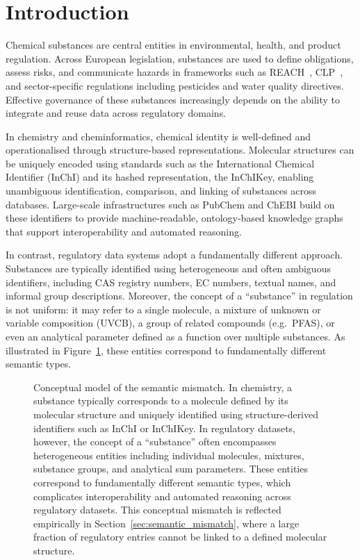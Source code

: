 \section{Introduction}
\label{sec:introduction}

Chemical substances are central entities in environmental, health, and product regulation. Across European legislation, substances are used to define obligations, assess risks, and communicate hazards in frameworks such as REACH~\cite{REACH2006}, CLP~\cite{CLP2008}, and sector-specific regulations including pesticides and water quality directives. Effective governance of these substances increasingly depends on the ability to integrate and reuse data across regulatory domains.

In chemistry and cheminformatics, chemical identity is well-defined and operationalised through structure-based representations. Molecular structures can be uniquely encoded using standards such as the International Chemical Identifier (InChI) and its hashed representation, the InChIKey, enabling unambiguous identification, comparison, and linking of substances across databases. Large-scale infrastructures such as PubChem and ChEBI build on these identifiers to provide machine-readable, ontology-based knowledge graphs that support interoperability and automated reasoning.

In contrast, regulatory data systems adopt a fundamentally different approach. Substances are typically identified using heterogeneous and often ambiguous identifiers, including CAS registry numbers, EC numbers, textual names, and informal group descriptions. Moreover, the concept of a “substance” in regulation is not uniform: it may refer to a single molecule, a mixture of unknown or variable composition (UVCB), a group of related compounds (e.g.\ PFAS), or even an analytical parameter defined as a function over multiple substances. As illustrated in Figure~\ref{fig:mismatch}, these entities correspond to fundamentally different semantic types.

\begin{figure}[!ht]
	\centering                 
	\caption{Conceptual model of the semantic mismatch.
		In chemistry, a substance typically corresponds to a molecule defined by its molecular structure and uniquely identified using structure-derived identifiers such as InChI or InChIKey. In regulatory datasets, however, the concept of a “substance” often encompasses heterogeneous entities including individual molecules, mixtures, substance groups, and analytical sum parameters. These entities correspond to fundamentally different semantic types, which complicates interoperability and automated reasoning across regulatory datasets.
		This conceptual mismatch is reflected empirically in Section~\ref{sec:semantic_mismatch}, where a large fraction of regulatory entries cannot be linked to a defined molecular structure.} \label{fig:mismatch}
\end{figure}   

